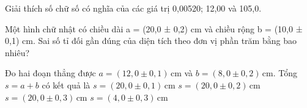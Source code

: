 \begin{bt}
Giải thích số chữ số có nghĩa của các giá trị 0,00520; 12,00 và 105,0.
\end{bt}

\begin{ex}
Một hình chữ nhật có chiều dài a = (20,0 ± 0,2) cm và chiều rộng b = (10,0 ± 0,1) cm. Sai số tỉ đối gần đúng của diện tích theo đơn vị phần trăm bằng bao nhiêu?
\end{ex}

\begin{ex}
Đo hai đoạn thẳng được $a=(12,0\pm0,1)\,\mathrm{cm}$ và $b=(8,0\pm0,2)\,\mathrm{cm}$.
 Tổng $s=a+b$ có kết quả là
\choice
{$s=(20,0\pm0,1)\,\mathrm{cm}$}
{$s=(20,0\pm0,2)\,\mathrm{cm}$}
{\True $s=(20,0\pm0,3)\,\mathrm{cm}$}
{$s=(4,0\pm0,3)\,\mathrm{cm}$}
\end{ex}

